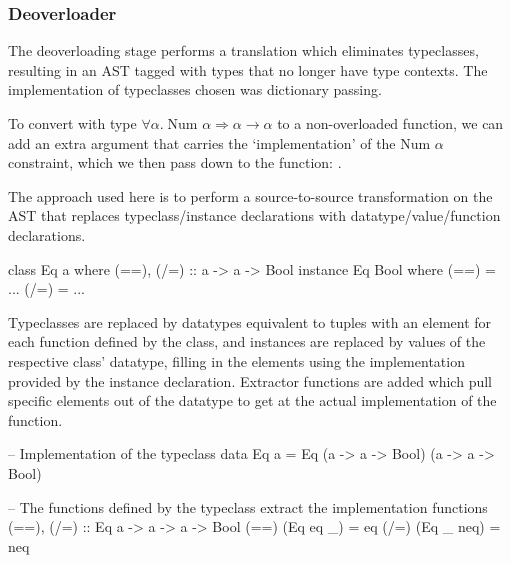 \documentclass[dissertation.tex]{subfiles}
\begin{document}
{{{        }
        \subsubsection{Deoverloader}\label{sec:deoverloading}
        {

            The deoverloading stage performs a translation which eliminates typeclasses, resulting in an AST tagged with
            types that no longer have type contexts. The implementation of typeclasses chosen was dictionary passing.

            To convert  with type \(\forall \alpha.\; \text{Num }\alpha \Rightarrow
            \alpha\rightarrow\alpha\) to a non-overloaded function, we can add an extra argument that carries the
            `implementation' of the \(\text{Num }\alpha\) constraint, which we then pass down to the \haskell{+}
            function: .


            The approach used here is to perform a source-to-source transformation on the AST that replaces
            typeclass/instance declarations with datatype/value/function declarations.

            \begin{haskellfigure}
            class Eq a where
                (==), (/=) :: a -> a -> Bool
            instance Eq Bool where
                (==) = ...
                (/=) = ...
            \end{haskellfigure}

            Typeclasses are replaced by datatypes equivalent to tuples with an element for each function defined by the
            class, and instances are replaced by values of the respective class' datatype, filling in the elements using
            the implementation provided by the instance declaration. Extractor functions are added which pull specific
            elements out of the datatype to get at the actual implementation of the function.

            \begin{haskellfigure}
            -- Implementation of the typeclass
            data Eq a = Eq (a -> a -> Bool) (a -> a -> Bool)

            -- The functions defined by the typeclass extract the implementation functions
            (==), (/=) :: Eq a -> a -> a -> Bool
            (==) (Eq eq _) = eq
            (/=) (Eq _ neq) = neq


\end{haskellfigure}}}}
\end{document}
